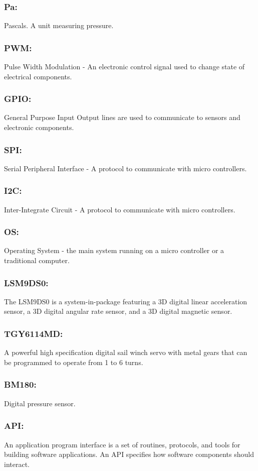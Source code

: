 \documentclass[10pt,draftclsnofoot,onecolumn,compsoc]{IEEEtran}
\begin{document}
\subsubsection{\bf Pa:} Pascals. A unit measuring pressure.
\subsubsection{\bf PWM:} Pulse Width Modulation - An electronic control signal used to change state of electrical components.
\subsubsection{\bf GPIO:}  General Purpose Input Output lines are used to communicate to sensors and electronic components.
\subsubsection{\bf SPI:}  Serial Peripheral Interface - A protocol to communicate with micro controllers.
\subsubsection{\bf I2C:}  Inter-Integrate Circuit - A protocol to communicate with micro controllers.
\subsubsection{\bf OS:} Operating System - the main system running on a micro controller or a traditional computer.
\subsubsection{\bf LSM9DS0:} The LSM9DS0 is a system-in-package featuring a 3D digital linear acceleration sensor,  a 3D digital angular rate sensor, and a 3D digital magnetic sensor.
\subsubsection{\bf TGY6114MD:}A powerful high specification digital sail winch servo with metal gears that can be programmed to operate from 1 to 6 turns.
\subsubsection{\bf BM180:}Digital pressure sensor.
\subsubsection{\bf API:}An application program interface is a set of routines, protocols, and tools for building software applications. An API specifies how software components should interact.
\end{document}

